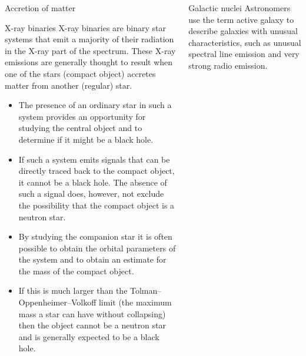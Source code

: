 \documentclass[20pt]{beamer}
\begin{document}
\begin{frame}[t]
\begin{columns}[t]
\begin{column}{0.32\linewidth}
\begin{block}{Accretion of matter}
\begin{itemize}
\end{itemize}
 



\end{block}

\begin{block}{X-ray binaries}
X-ray binaries are binary star systems that emit a majority of their radiation in the X-ray part of the spectrum. These X-ray emissions are generally thought to result when one of the stars (compact object) accretes matter from another (regular) star.

\begin{itemize}

	\item The presence of an ordinary star in such a system provides an opportunity for studying the central object and to determine if it might be a black hole.

	\item If such a system emits signals that can be directly traced back to the compact object, it cannot be a black hole. The absence of such a signal does, however, not exclude the possibility that the compact object is a neutron star.
	
	\item  By studying the companion star it is often possible to obtain the orbital parameters of the system and to obtain an estimate for the mass of the compact object.
	
	\item If this is much larger than the Tolman–Oppenheimer–Volkoff limit (the maximum mass a star can have without collapsing) then the object cannot be a neutron star and is generally expected to be a black hole.
	
\end{itemize}
 
\end{block}

\end{column}


\begin{column}{0.32\linewidth}

\begin{block}{Galactic nuclei}
	Astronomers use the term active galaxy to describe galaxies with unusual characteristics, such as unusual spectral line emission and very strong radio emission. 
	
\begin{itemize}


\end{itemize}
\end{block}
\end{column}
\end{columns}
\end{frame}
\end{document}
